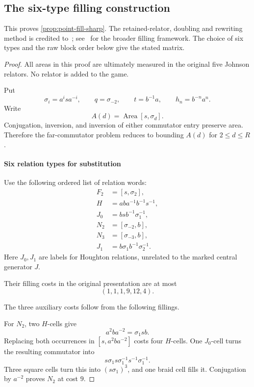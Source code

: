 \subsection{The six-type filling construction}\label{app:point-filling}
This proves \cref{prop:point-fill-sharp}. The retained-relator, doubling and rewriting method is credited to~\cite[Appendix~A and Remark~A.3]{DM-H3}; see~\cite[Section~4.2]{Lee12} for the broader filling framework. The choice of six types and the raw block order below give the stated matrix.
\begin{proof}
All areas in this proof are ultimately measured in the original five Johnson relators. No relator is added to the game.

Put
\[
\sigma_i=a^isa^{-i},\qquad q=\sigma_{-2},\qquad
t=b^{-1}a,\qquad h_n=b^{-n}a^n.
\]
Write
\[
A(d)=\operatorname{Area}[s,\sigma_d].
\]
Conjugation, inversion, and inversion of either commutator entry preserve area. Therefore the far-commutator problem reduces to bounding \(A(d)\) for \(2\le d\le R\).

\paragraph{Six relation types for substitution}

Use the following ordered list of relation words:
\[
\begin{aligned}
F_2&=[s,\sigma_2],\\
H&=aba^{-1}b^{-1}s^{-1},\\
J_0&=bsb^{-1}\sigma_1^{-1},\\
N_2&=[\sigma_{-2},b],\\
N_3&=[\sigma_{-3},b],\\
J_1&=b\sigma_1b^{-1}\sigma_2^{-1}.
\end{aligned}
\]
Here \(J_0,J_1\) are labels for Houghton relations, unrelated to the marked central generator \(J\).

Their filling costs in the original presentation are at most
\[
(1,1,1,9,12,4).
\]

The three auxiliary costs follow from the following fillings.

For \(N_2\), two \(H\)-cells give
\[
a^2ba^{-2}=\sigma_1sb.
\]
Replacing both occurrences in \([s,a^2ba^{-2}]\) costs four \(H\)-cells. One \(J_0\)-cell turns the resulting commutator into
\[
s\sigma_1s\sigma_1^{-1}s^{-1}\sigma_1^{-1}.
\]
Three square cells turn this into \((s\sigma_1)^3\), and one braid cell fills it. Conjugation by \(a^{-2}\) proves \(N_2\) at cost \(9\).


\end{proof}
